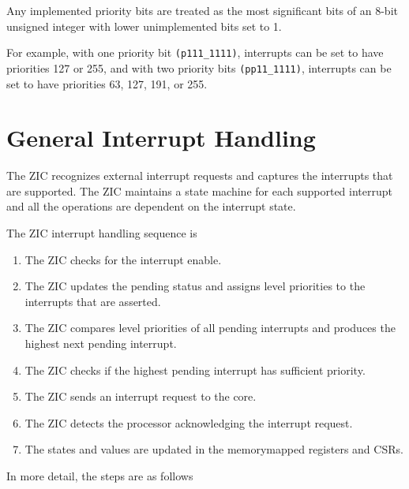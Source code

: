 Any implemented priority bits are treated as the most significant bits of an 8-bit unsigned integer with lower unimplemented bits set to 1. 

For example, with one priority bit \texttt{(p111\_1111)}, interrupts can be set to have priorities 127 or 255, and with two priority bits \texttt{(pp11\_1111)}, interrupts can be set to have priorities 63, 127, 191, or 255.

\section{General Interrupt Handling}
\label{sec:general-interrupt-handling}
The ZIC recognizes external interrupt requests and captures the interrupts that are supported. The ZIC maintains a state machine for each supported interrupt and all the operations are dependent on the interrupt state.

The ZIC interrupt handling sequence is

\begin{enumerate}
    \item The ZIC checks for the interrupt enable.
    \item The ZIC updates the pending status and assigns level priorities to the interrupts that are asserted.
    \item The ZIC compares level priorities of all pending interrupts and produces the highest next pending interrupt.
    \item The ZIC checks if the highest pending interrupt has sufficient priority.
    \item The ZIC sends an interrupt request to the core.
    \item The ZIC detects the processor acknowledging the interrupt request.
    \item The states and values are updated in the memory\-mapped registers and CSRs.
\end{enumerate}

In more detail, the steps are as follows


